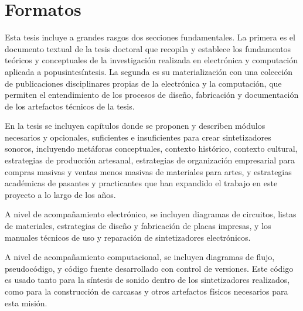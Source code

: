 \documentclass[../candidatura.tex]{subfiles}
\begin{document}
\section{Formatos}



Esta tesis incluye a grandes rasgos dos secciones fundamentales. La primera es el documento textual de la tesis doctoral que recopila y establece los fundamentos teóricos y conceptuales de la investigación realizada en electrónica y computación aplicada a popusintesíntesis. La segunda es su materialización con una colección de publicaciones disciplinares propias de la electrónica y la computación, que permiten el entendimiento de los procesos de diseño, fabricación y documentación de los artefactos técnicos de la tesis.

En la tesis se incluyen capítulos donde se proponen y describen módulos necesarios y opcionales, suficientes e insuficientes para crear sintetizadores sonoros, incluyendo metáforas conceptuales, contexto histórico, contexto cultural, estrategias de producción artesanal, estrategias de organización empresarial para compras masivas y ventas menos masivas de materiales para artes, y estrategias académicas de pasantes y practicantes que han expandido el trabajo en este proyecto a lo largo de los años.

A nivel de acompañamiento electrónico, se incluyen diagramas de circuitos, listas de materiales, estrategias de diseño y fabricación de placas impresas, y los manuales técnicos de uso y reparación de sintetizadores electrónicos.

A nivel de acompañamiento computacional, se incluyen diagramas de flujo, pseudocódigo, y código fuente desarrollado con control de versiones. Este código es usado tanto para la síntesis de sonido dentro de los sintetizadores realizados, como para la construcción de carcasas y otros artefactos físicos necesarios para esta misión.
\end{document}
